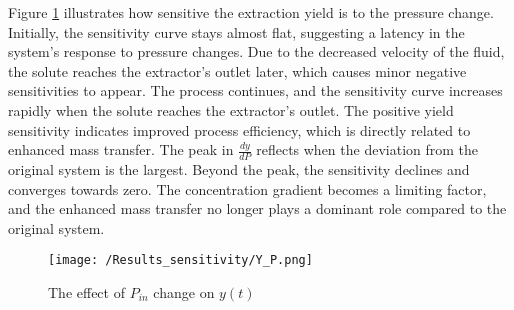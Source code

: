 \documentclass[../Article_Sensitivity_Analsysis.tex]{subfiles}
\begin{document}
	Figure \ref{fig:Sensitivty_P_y} illustrates how sensitive the extraction yield is to the pressure change. Initially, the sensitivity curve stays almost flat, suggesting a latency in the system's response to pressure changes. Due to the decreased velocity of the fluid, the solute reaches the extractor's outlet later, which causes minor negative sensitivities to appear. The process continues, and the sensitivity curve increases rapidly when the solute reaches the extractor's outlet. The positive yield sensitivity indicates improved process efficiency, which is directly related to enhanced mass transfer. The peak in $\frac{dy}{dP}$ reflects when the deviation from the original system is the largest. Beyond the peak, the sensitivity declines and converges towards zero. The concentration gradient becomes a limiting factor, and the enhanced mass transfer no longer plays a dominant role compared to the original system.
	
	\begin{figure}[!ht]
		\centering
		\texttt{[image: /Results\_sensitivity/Y\_P.png]}
		\caption{The effect of $P_{in}$ change on $y(t)$}
		\label{fig:Sensitivty_P_y}
	\end{figure}
		
\end{document}
